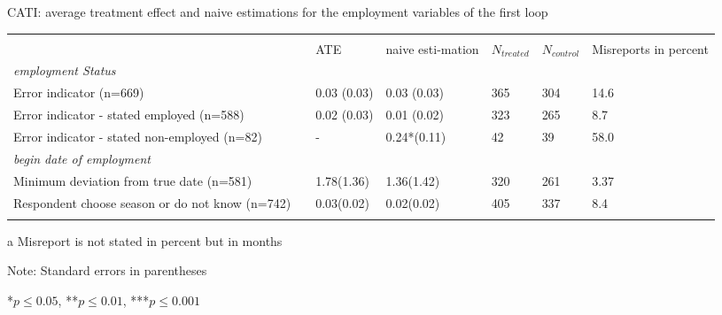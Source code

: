 \begin{threeparttable}[h]
	\centering
	\singlespacing
	\caption{CATI: average treatment effect and naive estimations for the employment variables of the first loop}
	\label{tab:emp_loop1}
	\begin{tabularx}{\textwidth}{@{}Xp{0.1cm}p{1.5cm}p{1.5cm}p{1cm}p{1cm}p{1.5cm}}
		&               &     &       &     &    &       \\
		& & ATE & naive \newline esti-mation & \(N_{treated}\) & \(N_{control}\) & Misreports \newline in \newline percent \\
		
		\textit{employment Status}                                   	 							&               &   &  &            &                & \\ \midrule\addlinespace 
		Error indicator (n=669) &	 &0.03 \newline (0.03)    &0.03 \newline (0.03)           &365 & 304 &14.6               \\ \addlinespace \addlinespace
	 Error indicator - stated employed (n=588) &        &0.02 \newline (0.03)    &0.01 \newline (0.02) &323 &265&8.7                 \\  \addlinespace\addlinespace
	Error indicator - stated non-employed (n=82) & &-&0.24*\newline (0.11)&42&39&58.0 \\ \addlinespace \addlinespace
		\textit{begin date of employment}                               								&&&& & \\ \midrule\addlinespace
	 Minimum deviation from true date (n=581) &            &1.78\newline (1.36)&1.36\newline (1.42)&320&261&3.37\tnote{a} \\ \addlinespace \addlinespace
	Respondent choose season or do not know (n=742)  &     &0.03\newline (0.02)&0.02\newline (0.02)&405&337&8.4 \\ \addlinespace
		\bottomrule                         
	\end{tabularx}
	\begin{tablenotes}
		\begin{footnotesize}
			\item[a] Misreport is not stated in percent but in months
			\item{Note: Standard errors in parentheses}
			\item{*\(p \le 0.05\), **\(p \le 0.01\), ***\(p \le 0.001\)}
		\end{footnotesize}
	\end{tablenotes}
\end{threeparttable}